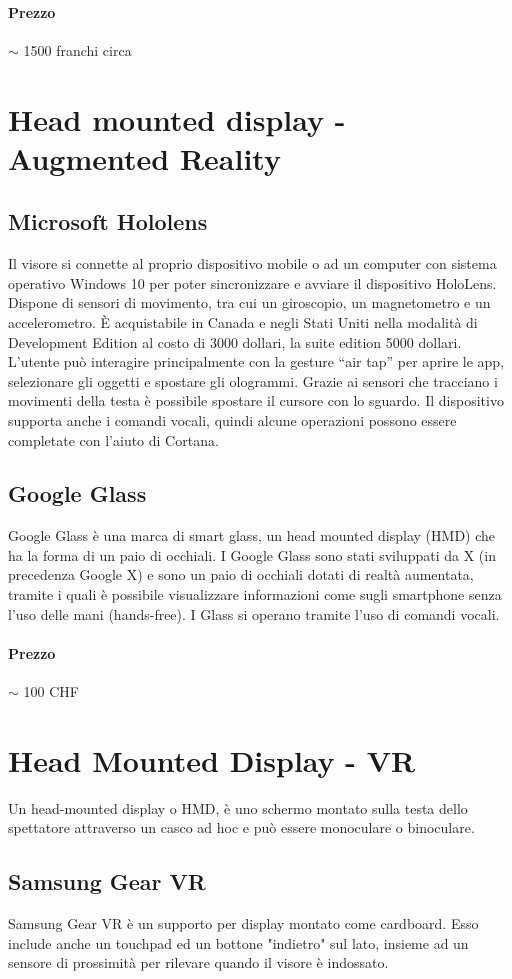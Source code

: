 \documentclass[8pt]{extarticle}
\begin{document}
\begin{multicols}{3}
\paragraph{Prezzo}
$\sim$ 1500 franchi circa
\section{Head mounted display - Augmented Reality}
\subsection{Microsoft Hololens}
Il visore si connette al proprio dispositivo mobile o ad un computer con sistema operativo Windows 10 per poter sincronizzare e avviare il dispositivo HoloLens.
Dispone di sensori di movimento, tra cui un giroscopio, un magnetometro e un accelerometro.
È acquistabile in Canada e negli Stati Uniti nella modalità di Development Edition al costo di 3000 dollari, la suite edition 5000 dollari.
L’utente può interagire principalmente con la gesture “air tap” per aprire le app, selezionare gli oggetti e spostare gli ologrammi. Grazie ai sensori che tracciano i movimenti della testa è possibile spostare il cursore con lo sguardo. Il dispositivo supporta anche i comandi vocali, quindi alcune operazioni possono essere completate con l’aiuto di Cortana.
\subsection{Google Glass}
Google Glass è una marca di smart glass, un head mounted display (HMD) che ha la forma di un paio di occhiali. 
I Google Glass sono stati sviluppati da X (in precedenza Google X) e sono un paio di occhiali dotati di realtà 
aumentata, tramite i quali è possibile visualizzare informazioni come sugli smartphone senza l'uso delle mani (hands-free). I Glass si operano tramite l'uso di comandi vocali.

\paragraph{Prezzo} $\sim$ 100 CHF
\section{Head Mounted Display - VR}
Un head-mounted display o HMD, è uno schermo montato sulla testa dello spettatore attraverso un casco ad hoc e può essere monoculare o binoculare.
\subsection{Samsung Gear VR}
Samsung Gear VR è un supporto per display montato come cardboard.
Esso include anche un touchpad ed un bottone "indietro" sul lato, insieme ad un 
sensore di prossimità per rilevare quando il visore è indossato.


\end{multicols}
\end{document}
